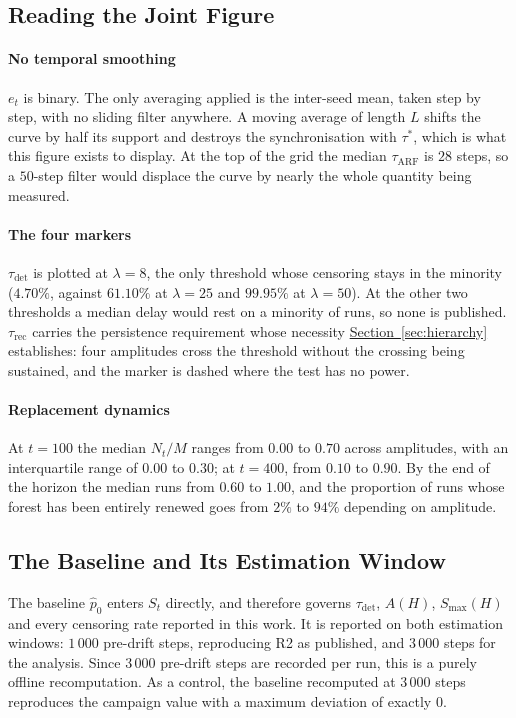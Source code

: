\documentclass[10pt,conference]{IEEEtran}
\theoremstyle{definition}
\begin{document}
\subsection{Reading the Joint Figure}

\paragraph{No temporal smoothing} $e_t$ is binary. The only averaging applied is the
inter-seed mean, taken step by step, with no sliding filter anywhere. A moving average of
length $L$ shifts the curve by half its support and destroys the synchronisation with
$\tau^*$, which is what this figure exists to display. At the top of the grid the median
$\tau_{\mathrm{ARF}}$ is $28$ steps, so a $50$-step filter would displace the curve by
nearly the whole quantity being measured.

\paragraph{The four markers} $\tau_{\mathrm{det}}$ is plotted at $\lambda = 8$, the only
threshold whose censoring stays in the minority ($4.70\%$, against $61.10\%$ at
$\lambda = 25$ and $99.95\%$ at $\lambda = 50$). At the other two thresholds a median
delay would rest on a minority of runs, so none is published. $\tau_{\mathrm{rec}}$ carries
the persistence requirement whose necessity \hyperref[sec:hierarchy]{Section~\ref*{sec:hierarchy}} establishes: four
amplitudes cross the threshold without the crossing being sustained, and the marker is
dashed where the test has no power.

\paragraph{Replacement dynamics} At $t = 100$ the median $N_t/M$ ranges from $0.00$ to
$0.70$ across amplitudes, with an interquartile range of $0.00$ to $0.30$; at $t = 400$,
from $0.10$ to $0.90$. By the end of the horizon the median runs from $0.60$ to $1.00$,
and the proportion of runs whose forest has been entirely renewed goes from $2\%$ to
$94\%$ depending on amplitude.

\subsection{The Baseline and Its Estimation Window}
\label{sec:d1:socle}

The baseline $\hat p_0$ enters $S_t$ directly, and therefore governs $\tau_{\mathrm{det}}$,
$A(H)$, $S_{\max}(H)$ and every censoring rate reported in this work. It is reported on
both estimation windows: $1\,000$ pre-drift steps, reproducing R2 as published,
and $3\,000$ steps for the analysis. Since $3\,000$ pre-drift steps are recorded per run,
this is a purely offline recomputation. As a control, the baseline recomputed at $3\,000$
steps reproduces the campaign value with a maximum deviation of exactly $0$.
\end{document}
